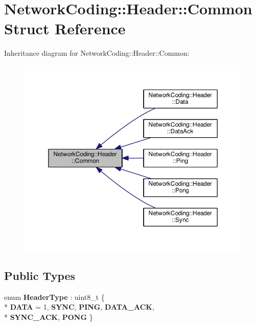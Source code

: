 \hypertarget{struct_network_coding_1_1_header_1_1_common}{}\section{Network\+Coding\+:\+:Header\+:\+:Common Struct Reference}
\label{struct_network_coding_1_1_header_1_1_common}


Inheritance diagram for Network\+Coding\+:\+:Header\+:\+:Common\+:\nopagebreak
\begin{figure}[H]
\begin{center}
\leavevmode
\includegraphics[width=350pt]{struct_network_coding_1_1_header_1_1_common__inherit__graph}
\end{center}
\end{figure}
\subsection*{Public Types}
\begin{DoxyCompactItemize}
\item 
enum {\bfseries Header\+Type} \+: uint8\+\_\+t \{ \\*
{\bfseries D\+A\+TA} = 1, 
{\bfseries S\+Y\+NC}, 
{\bfseries P\+I\+NG}, 
{\bfseries D\+A\+T\+A\+\_\+\+A\+CK}, 
\\*
{\bfseries S\+Y\+N\+C\+\_\+\+A\+CK}, 
{\bfseries P\+O\+NG}
 \}\hypertarget{struct_network_coding_1_1_header_1_1_common_a541c101565c64aee2a50ac90ed9f04b7}{}\label{struct_network_coding_1_1_header_1_1_common_a541c101565c64aee2a50ac90ed9f04b7}

\end{DoxyCompactItemize}
